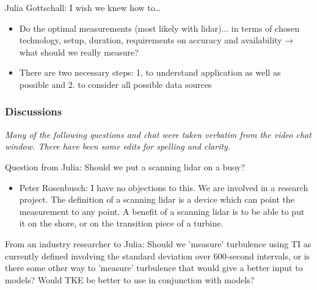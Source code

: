 Julia Gottschall: I wish we knew how to\ldots{}

\begin{itemize}
    \item Do the optimal measurements (most likely with lidar)... in terms of chosen technology, setup, duration, requirements on accuracy and availability → what should we really measure?
    \item There are two necessary steps: 1, to understand application as well as possible and 2. to consider all possible data sources
\end{itemize}

\subsubsection{Discussions}

\emph{Many of the following questions and chat were taken verbatim from the video chat window. There have been some edits for spelling and clarity.}

Question from Julia: Should we put a scanning lidar on a buoy?

\begin{itemize}
\item  Peter Rosenbusch: I have no objections to this. We are involved in a
  research project. The definition of a scanning lidar is a device which
  can point the measurement to any point. A benefit of a scanning lidar
  is to be able to put it on the shore, or on the transition piece of a
  turbine.
\end{itemize}

From an industry researcher to Julia: Should we 'measure' turbulence using TI as currently defined involving the standard deviation over 600-second intervals, or is there some other way to 'measure' turbulence that would give a better input to models? Would TKE be better to use in conjunction with models?

